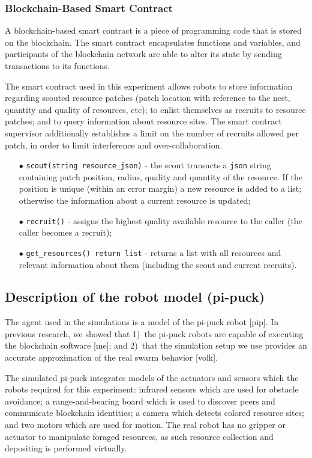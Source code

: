 \documentclass[runningheads]{llncs}
\newcommand{\rab}{range-and-bearing\xspace}
\begin{document}
\subsubsection{Blockchain-Based Smart Contract}
\label{sec:smart-contract}

A blockchain-based smart contract is a piece of programming code that is stored on the blockchain. The smart contract encapsulates functions and variables, and participants of the blockchain network are able to alter its state by sending transactions to its functions. 

The smart contract used in this experiment allows robots to store information regarding scouted resource patches (patch location with reference to the nest, quantity and quality of resources, etc); to enlist themselves as recruits to resource patches; and to query information about resource sites. The smart contract supervisor additionally establishes a limit on the number of recruits allowed per patch, in order to limit interference and over-collaboration.

\begin{itemize}
	\item[$\bullet$] \texttt{scout(string resource\_json)} - the scout transacts a \texttt{json} string containing patch position, radius, quality and quantity of the resource. If the position is unique (within an error margin) a new resource is added to a list; otherwise the information about a current resource is updated;
	\item[$\bullet$] \texttt{recruit()} - assigns the highest quality available resource to the caller (the caller becomes a recruit);
	\item[$\bullet$] \texttt{get\_resources() return list} - returns a list with all resources and relevant information about them (including the scout and current recruits).
\end{itemize}

\subsection{Description of the robot model (pi-puck)}
The agent used in the simulations is a model of the pi-puck robot [pip]. In previous research, we showed that 1)~the pi-puck robots are capable of executing the blockchain software [me]; and 2)~that the simulation setup we use provides an accurate approximation of the real swarm behavior [volk]. 

The simulated pi-puck integrates models of the actuators and sensors which the robots required for this experiment: infrared sensors which are used for obstacle avoidance; a \rab board which is used to discover peers and communicate blockchain identities; a camera which detects colored resource sites; and two motors which are used for motion. The real robot has no gripper or actuator to manipulate foraged resources, as such resource collection and depositing is performed virtually. %
 
\end{document}

